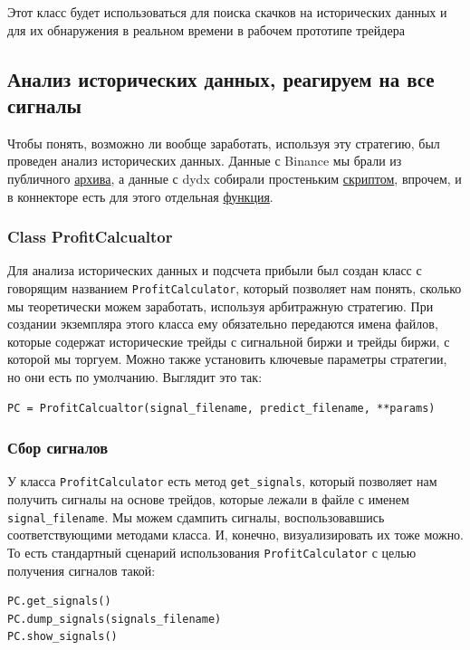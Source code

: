 Этот класс будет использоваться для поиска скачков на исторических данных и для их обнаружения в реальном времени в рабочем прототипе трейдера

\subsection{Анализ исторических данных, реагируем на все сигналы}
Чтобы понять, возможно ли вообще заработать, используя эту стратегию, был проведен анализ исторических данных. Данные с Binance мы брали из публичного \href{https://data.binance.vision/}{архива}, а данные с dydx собирали простеньким \href{https://github.com/dexety/dex-trading-system/blob/90a2ccd08234584b2ab9a274fe82533a55b924d9/research/ib-0002-cross-analysis/dydx_get_trades.py#L10}{скриптом}, впрочем, и в коннекторе есть для этого отдельная \href{https://github.com/dexety/dex-trading-system/blob/90a2ccd08234584b2ab9a274fe82533a55b924d9/connectors/dydx/connector.py#L158}{функция}.

\subsubsection{Class ProfitCalcualtor}
Для анализа исторических данных и подсчета прибыли был создан класс с говорящим названием \texttt{ProfitCalculator}, который позволяет нам понять, сколько мы теоретически можем заработать, используя арбитражную стратегию. При создании экземпляра этого класса ему обязательно передаются имена файлов, которые содержат исторические трейды с сигнальной биржи и трейды биржи, с которой мы торгуем. Можно также установить ключевые параметры стратегии, но они есть по умолчанию. Выглядит это так:
\begin{verbatim}
PC = ProfitCalcualtor(signal_filename, predict_filename, **params)
\end{verbatim}

\subsubsection{Сбор сигналов}
У класса \texttt{ProfitCalculator} есть метод \texttt{get\_signals}, который позволяет нам получить сигналы на основе трейдов, которые лежали в файле с именем \texttt{signal\_filename}. Мы можем сдампить сигналы, воспользовавшись соответствующими методами класса. И, конечно, визуализировать их тоже можно. То есть стандартный сценарий использования \texttt{ProfitCalculator} с целью получения сигналов такой:
\begin{verbatim}
PC.get_signals()
PC.dump_signals(signals_filename)
PC.show_signals()
\end{verbatim}

